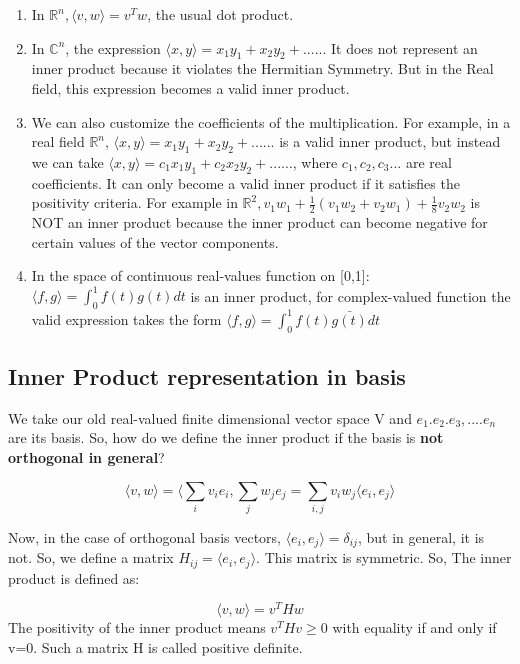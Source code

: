 \begin{enumerate}
    \item In $\mathbb{R}^n, \langle v, w \rangle =v^Tw$, the usual dot product.
    \item In $\mathbb{C}^n$, the expression $\langle x, y \rangle =x_1y_1 + x_2y_2+ ......$
    It does not represent an inner product because it violates the Hermitian Symmetry. But in the Real field, this expression becomes a valid inner product.
    \item We can also customize the coefficients of the multiplication. For example, in a real field $\mathbb{R}^n$, $\langle x, y \rangle =x_1y_1 + x_2y_2+ ......$ is a valid inner product, but instead we can take $\langle x, y \rangle =c_1x_1y_1 + c_2x_2y_2+ ......$, where $c_1, c_2, c_3... $ are real coefficients. It can only become a valid inner product if it satisfies the positivity criteria. For example in $\mathbb{R}^2, v_1w_1 +\frac{1}{2}
    (v_1w_2 + v_2w_1) + \frac{1}{8}v_2w_2$ is NOT an inner product because the inner product can become negative for certain values of the vector components.
    \item In the space of continuous real-values function on [0,1]: $\langle f,g \rangle =\int_0^1 f(t)g(t)dt$ is an inner product, for complex-valued function the valid expression takes the form $\langle f,g \rangle =\int_0^1 f(t)\bar{g(t)}dt$
\end{enumerate}

\subsection{Inner Product representation in basis}

We take our old real-valued finite dimensional vector space V and $e_1. e_2. e_3, .... e_n$ are its basis. So, how do we define the inner product if the basis is \textbf{not orthogonal in general}?

$$\langle v,w \rangle = \langle \sum_i v_i e_i, \sum_j w_j e_j=\sum_{i,j} v_i w_j \langle e_i, e_j \rangle$$

Now, in the case of orthogonal basis vectors, $\langle e_i, e_j \rangle =\delta_{ij}$, but in general, it is not. So, we define a matrix $H_{ij}=\langle e_i, e_j \rangle$. This matrix is symmetric. So, The inner product is defined as:

$$\langle v,w \rangle= v^THw$$
 The positivity of the inner product means $v^THv\geq 0$ with equality if and only if v=0. Such a matrix H is called positive definite. 

